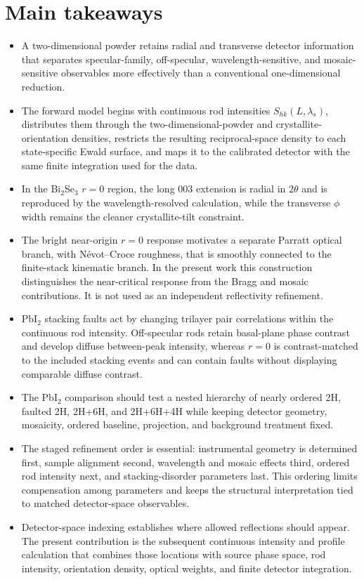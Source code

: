 \section{Main takeaways}
\begin{itemize}
  \item A two-dimensional powder retains radial and transverse detector information that separates specular-family, off-specular, wavelength-sensitive, and mosaic-sensitive observables more effectively than a conventional one-dimensional reduction.

  \item The forward model begins with continuous rod intensities $S_{hk}(L,\lambda_s)$, distributes them through the two-dimensional-powder and crystallite-orientation densities, restricts the resulting reciprocal-space density to each state-specific Ewald surface, and maps it to the calibrated detector with the same finite integration used for the data.

  \item In the Bi$_2$Se$_3$ $r=0$ region, the long $003$ extension is radial in $2\theta$ and is reproduced by the wavelength-resolved calculation, while the transverse $\phi$ width remains the cleaner crystallite-tilt constraint.

  \item The bright near-origin $r=0$ response motivates a separate Parratt optical branch, with N\'evot--Croce roughness, that is smoothly connected to the finite-stack kinematic branch. In the present work this construction distinguishes the near-critical response from the Bragg and mosaic contributions. It is not used as an independent reflectivity refinement.

  \item PbI$_2$ stacking faults act by changing trilayer pair correlations within the continuous rod intensity. Off-specular rods retain basal-plane phase contrast and develop diffuse between-peak intensity, whereas $r=0$ is contrast-matched to the included stacking events and can contain faults without displaying comparable diffuse contrast.

  \item The PbI$_2$ comparison should test a nested hierarchy of nearly ordered 2H, faulted 2H, 2H+6H, and 2H+6H+4H while keeping detector geometry, mosaicity, ordered baseline, projection, and background treatment fixed.

  \item The staged refinement order is essential: instrumental geometry is determined first, sample alignment second, wavelength and mosaic effects third, ordered rod intensity next, and stacking-disorder parameters last. This ordering limits compensation among parameters and keeps the structural interpretation tied to matched detector-space observables.

  \item Detector-space indexing establishes where allowed reflections should appear. The present contribution is the subsequent continuous intensity and profile calculation that combines those locations with source phase space, rod intensity, orientation density, optical weights, and finite detector integration.\cite{SmilgiesLi2026IndexGIXS}
\end{itemize}
